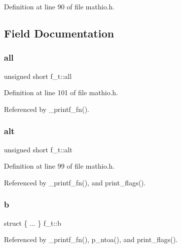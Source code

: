 Definition at line 90 of file mathio.\+h.



\subsection{Field Documentation}
\mbox{\label{unionf__t_aab0615c9ada80b0f986b58639ea8c480}} 
\subsubsection{\texorpdfstring{all}{all}}
{\footnotesize\ttfamily unsigned short f\+\_\+t\+::all}



Definition at line 101 of file mathio.\+h.



Referenced by \+\_\+printf\+\_\+fn().

\mbox{\label{unionf__t_a907a8d8af4803c9a18bc0586d22d6881}} 
\subsubsection{\texorpdfstring{alt}{alt}}
{\footnotesize\ttfamily unsigned short f\+\_\+t\+::alt}



Definition at line 99 of file mathio.\+h.



Referenced by \+\_\+printf\+\_\+fn(), and print\+\_\+flags().

\mbox{\label{unionf__t_ab12d573627108be21a1ea9f5d5dae3c9}} 
\subsubsection{\texorpdfstring{b}{b}}
{\footnotesize\ttfamily struct \{ ... \}   f\+\_\+t\+::b}



Referenced by \+\_\+printf\+\_\+fn(), p\+\_\+ntoa(), and print\+\_\+flags().

\mbox{\label{unionf__t_a5f89cd6194ccc6a288f1fe31d39b2e64}} 
